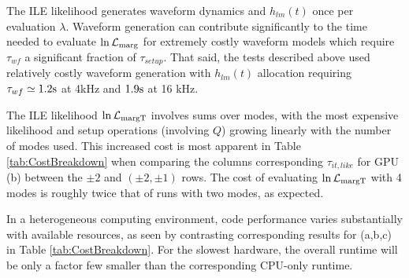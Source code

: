 \documentclass[twocolumn,prd,nofootinbib]{revtex4}
\newcommand\unit[1]{{\rm #1}}
\newcommand\ILE{ILE}
\begin{document}
The \ILE{} likelihood  generates waveform dynamics and $h_{lm}(t)$ once per evaluation $\lambda$.   Waveform generation can contribute significantly to the
time needed to evaluate  $\ln {\cal L}_{\rm marg}$ for extremely costly
waveform models which require $\tau_{wf} $ a significant fraction of $  \tau_{setup}$.   That said, the tests described
above used relatively costly waveform generation with $h_{lm}(t)$ allocation requiring $\tau_{wf} \simeq 1.2 \unit{s}$
at 4kHz and $1.9\unit{s}$ at 16 kHz.

The \ILE{} likelihood $\ln {\cal L}_{\rm margT}$ involves sums over modes, with the most expensive likelihood and setup operations (involving $Q$) growing linearly with
the number of modes used.  This increased cost is most apparent in Table \ref{tab:CostBreakdown} when comparing the
columns corresponding  $\tau_{it,like}$ for GPU (b) between the $\pm 2$ and $(\pm 2,\pm 1)$ rows.  The cost of
evaluating $\ln {\cal L}_{\rm margT}$   with 4 modes is roughly twice that of runs with two modes, as expected. 

In a heterogeneous computing environment, code performance varies substantially with available resources, as seen by
contrasting corresponding results for (a,b,c) in Table \ref{tab:CostBreakdown}.      For
the slowest hardware,  the overall runtime will be only a factor few smaller than the corresponding CPU-only runtime.
\end{document}

